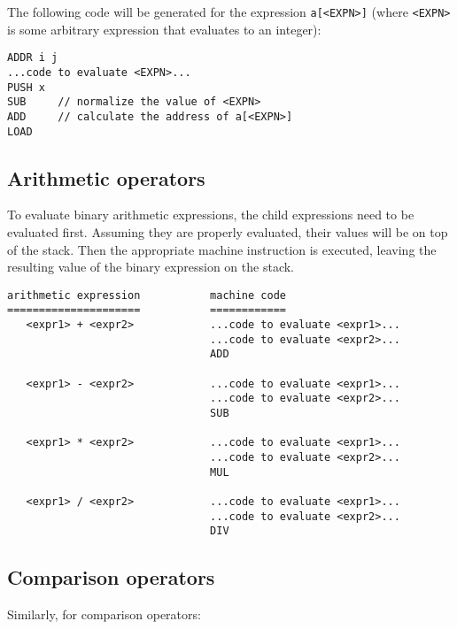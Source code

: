 \documentclass[11pt]{article}
\begin{document}
The following code will be generated for the expression \texttt{a[<EXPN>]} (where \texttt{<EXPN>} is some arbitrary expression that evaluates to an integer):

\begin{verbatim}
ADDR i j
...code to evaluate <EXPN>...
PUSH x
SUB     // normalize the value of <EXPN>
ADD     // calculate the address of a[<EXPN>]
LOAD
\end{verbatim}

\subsection{Arithmetic operators}

To evaluate binary arithmetic expressions, the child expressions need to be evaluated first. Assuming they are properly evaluated, their values will be on top of the stack. Then the appropriate machine instruction is executed, leaving the resulting value of the binary expression on the stack.

\begin{verbatim}
arithmetic expression           machine code
=====================           ============
   <expr1> + <expr2>            ...code to evaluate <expr1>...
                                ...code to evaluate <expr2>...
                                ADD

   <expr1> - <expr2>            ...code to evaluate <expr1>...
                                ...code to evaluate <expr2>...
                                SUB

   <expr1> * <expr2>            ...code to evaluate <expr1>...
                                ...code to evaluate <expr2>...
                                MUL

   <expr1> / <expr2>            ...code to evaluate <expr1>...
                                ...code to evaluate <expr2>...
                                DIV
\end{verbatim}

\subsection{Comparison operators}

Similarly, for comparison operators:
\end{document}
